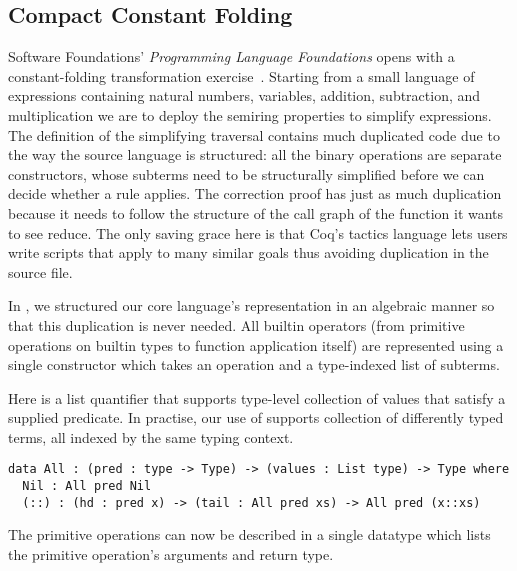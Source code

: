 \subsection{Compact Constant Folding}
\label{sec:design:constants}

Software Foundations' \emph{Programming Language Foundations} opens with a constant-folding transformation exercise~\cite[Chapter~1]{Pierce:SF2}.
%
Starting from a small language of expressions containing natural numbers, variables, addition, subtraction, and multiplication we are to deploy the semiring properties to simplify expressions.
%
The definition of the simplifying traversal contains much duplicated code due to the way the source language is structured:
%
all the binary operations are separate constructors, whose subterms need to be structurally simplified before we can decide whether a rule applies.
%
The correction proof has just as much duplication because it needs to follow the structure of the call graph of the function it wants to see reduce.
%
The only saving grace here is that Coq's tactics language lets users write scripts that apply to many similar goals thus avoiding duplication in the source file.

In \Velo{}, we structured our core language's representation in an algebraic
manner so that this duplication is never needed.
%
All builtin operators (from primitive operations on builtin types to function
application itself) are represented using a single  constructor
which takes an operation and a type-indexed list of subterms.



Here  is a list quantifier that supports type-level collection of values that satisfy a supplied predicate.
In practise, our use of  supports collection of differently typed terms, all indexed by the same typing context.

\begin{Verbatim}
data All : (pred : type -> Type) -> (values : List type) -> Type where
  Nil : All pred Nil
  (::) : (hd : pred x) -> (tail : All pred xs) -> All pred (x::xs)
\end{Verbatim}

The primitive operations can now be described in a single datatype  which lists the primitive operation's arguments and return type.

\begin{comment}
\IdrisData{Zero}---which takes no argument and returns a term of type \IdrisData{TyNat};
%
\IdrisData{Inc}---which takes an arguments of type \IdrisData{TyNat} and returns a term
of type \IdrisData{TyNat};
%
and
%
\IdrisData{App}---which takes a function and an argument that corresponds to the type of the function's domain and returns a term that is the type of the function's co-domain.
\end{comment}

